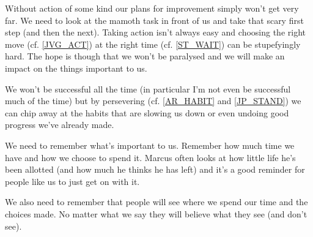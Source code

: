 \cleardoublepage

Without action of some kind our plans for improvement simply won't get very far. We need to look at the mamoth task in front of us and take that scary first step (and then the next). 
Taking action isn't always easy and choosing the right move (cf. \ref{JVG_ACT}) at the right time (cf. \ref{ST_WAIT}) can be stupefyingly hard.
The hope is though that we won't be paralysed and we will make an impact on the things important to us.

We won't be successful all the time (in particular I'm not even be successful much of the time) but by persevering (cf. \ref{AR_HABIT} and \ref{JP_STAND}) we can chip away at the habits that are slowing us down or even undoing good progress we've already made.

We need to remember what's important to us. Remember how much time we have and how we choose to spend it. Marcus often looks at how little life he's been allotted (and how much he thinks he has left) and it's a good reminder for people like us to just get on with it.

We also need to remember that people will see where we spend our time and the choices made. No matter what we say they will believe what they see (and don't see). 

\clearpage
